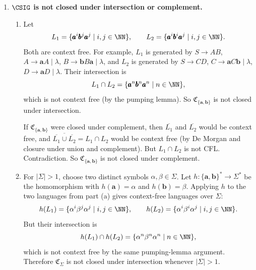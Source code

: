 \begin{enumerate}[{9.}1. ]
Now take
\[
L_1=\Sigma^*,\qquad L_2=\Sigma^*-K.
\]
Both $L_1$ and $L_2$ are context free, but
\[
L_1-L_2=K,
\]
which is not context free.  Hence
$\mathfrak{C}_{\{\pmb{a},\pmb{b}\}}$ is not closed under relative complement.

The same conclusion also follows from the closure properties: if
$\mathfrak{C}_{\{\pmb{a},\pmb{b}\}}$ were closed under relative complement and
we know it is closed under union, then it would be
closed under complement (since $\overline{L_1} = \Sigma^* - L_1$, and
$\Sigma^*$ is CFL). But part (a) of the next exercise shows that
$\mathfrak{C}_{\{\pmb{a},\pmb{b}\}}$ is not closed under complement. Hence
$\mathfrak{C}_{\{\pmb{a},\pmb{b}\}}$ is \emph{not} closed under relative
complement. \qed

\item \textbf{$\CSIG$ is not closed under intersection or complement.}

\begin{enumerate}
\item Let
\[
L_1=\{\pmb{a}^i\pmb{b}^j\pmb{a}^j\mid i,j\in\NN\},\qquad
L_2=\{\pmb{a}^i\pmb{b}^i\pmb{a}^j\mid i,j\in\NN\}.
\]
Both are context free.  For example, $L_1$ is generated by
$S\to AB$, $A\to\pmb{a}A\mid\lambda$,
$B\to\pmb{b}B\pmb{a}\mid\lambda$, and $L_2$ is generated by
$S\to CD$, $C\to\pmb{a}C\pmb{b}\mid\lambda$,
$D\to\pmb{a}D\mid\lambda$.  Their intersection is
\[
L_1 \cap L_2 = \{\pmb{a}^n\pmb{b}^n\pmb{a}^n \mid n \in \NN\},
\]
which is not context free (by the pumping lemma). So
$\mathfrak{C}_{\{\pmb{a},\pmb{b}\}}$ is not closed under intersection.

If $\mathfrak{C}_{\{\pmb{a},\pmb{b}\}}$ were closed under complement, then
$\overline{L_1}$ and $\overline{L_2}$ would be context free, and
$\overline{\overline{L_1} \cup \overline{L_2}} = L_1 \cap L_2$ would be context
free (by De Morgan and closure under union and complement). But
$L_1 \cap L_2$ is not CFL. Contradiction. So
$\mathfrak{C}_{\{\pmb{a},\pmb{b}\}}$ is not closed under complement.

\item For $|\Sigma| > 1$, choose two distinct symbols $\alpha,\beta\in\Sigma$.
Let $h:\{\pmb{a},\pmb{b}\}^*\to\Sigma^*$ be the homomorphism with
$h(\pmb{a})=\alpha$ and $h(\pmb{b})=\beta$.  Applying $h$ to the two languages
from part (a) gives context-free languages over $\Sigma$:
\[
h(L_1)=\{\alpha^i\beta^j\alpha^j\mid i,j\in\NN\},\qquad
h(L_2)=\{\alpha^i\beta^i\alpha^j\mid i,j\in\NN\}.
\]
But their intersection is
\[
h(L_1)\cap h(L_2)=\{\alpha^n\beta^n\alpha^n\mid n\in\NN\},
\]
which is not context free by the same pumping-lemma argument.  Therefore
$\mathfrak{C}_{\Sigma}$ is not closed under intersection whenever $|\Sigma|>1$.


\end{enumerate}
\end{enumerate}
